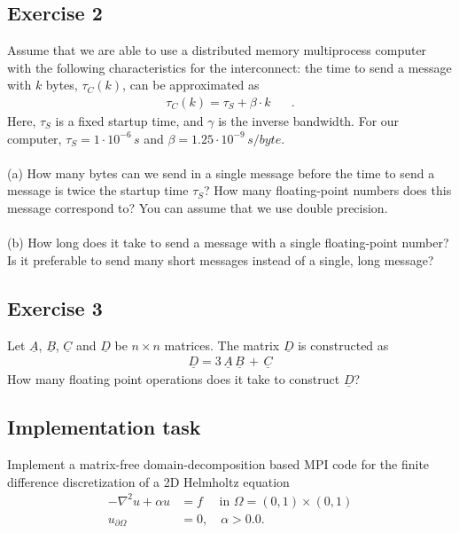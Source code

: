 \documentclass[11pt]{article}
\begin{document}
\clearpage
\subsection*{Exercise 2}

Assume that we are able to use a distributed memory multiprocess computer with the 
following characteristics for the interconnect: the time to send a
message with $k$ bytes, $\tau_C(k)$, can be approximated as 
\begin{eqnarray*}
\tau_C(k) = \tau_S + \beta \cdot k \,\,\,\,\,\,\,\,\,\, .
\end{eqnarray*}
Here, $\tau_S$ is a fixed startup time, and $\gamma$ is the inverse bandwidth.
For our computer, $\tau_S = 1\cdot 10^{-6} \,s$ and $\beta = 1.25\cdot  10^{-9}\, s/byte$.\\
\\
(a) How many bytes can we send in a single message before the time to send a message 
is twice the startup time $\tau_S$? How many floating-point numbers does this 
message correspond to? You can assume that we use double precision.\\
\\
(b) How long does it take to send a message with a single floating-point number?
Is it preferable to send many short messages instead of a single, long message? 

\subsection*{Exercise 3}

Let $\underline{A}$, $\underline{B}$, $\underline{C}$ and $\underline{D}$ be $n\times n$ matrices. 
The matrix $\underline{D}$ is constructed as 
\begin{eqnarray*}
\underline{D} = 3\,\underline{A}\,\underline{B} \,+\, \underline{C}
\end{eqnarray*}
How many floating point operations does it take to construct $\underline{D}$?

\subsection*{Implementation task}
Implement a matrix-free domain-decomposition based MPI code for the finite difference
discretization of a 2D Helmholtz equation
\[
  \begin{split}
    -\nabla^2 u + \alpha u &= f \quad \text{ in } \Omega = (0,1)\times(0,1) \\
    u_{\partial\Omega} &= 0, \quad \alpha > 0.0.
  \end{split}
\]
\end{document}
